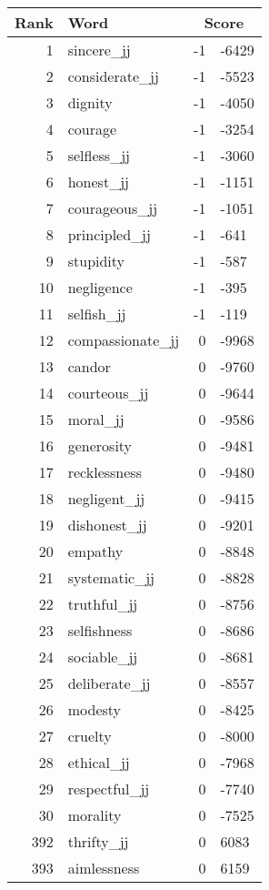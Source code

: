 \begin{longtable}[!htbp]{| rlr@{.}l |}
    \hline
    \textbf{Rank} & \textbf{Word} & \multicolumn{2}{c|}{\textbf{Score}} \\
    \hline
    \endhead
    1 & sincere\_jj & -1 & -6429 \\
    2 & considerate\_jj & -1 & -5523 \\
    3 & dignity & -1 & -4050 \\
    4 & courage & -1 & -3254 \\
    5 & selfless\_jj & -1 & -3060 \\
    6 & honest\_jj & -1 & -1151 \\
    7 & courageous\_jj & -1 & -1051 \\
    8 & principled\_jj & -1 & -641 \\
    9 & stupidity & -1 & -587 \\
    10 & negligence & -1 & -395 \\
    11 & selfish\_jj & -1 & -119 \\
    12 & compassionate\_jj & 0 & -9968 \\
    13 & candor & 0 & -9760 \\
    14 & courteous\_jj & 0 & -9644 \\
    15 & moral\_jj & 0 & -9586 \\
    16 & generosity & 0 & -9481 \\
    17 & recklessness & 0 & -9480 \\
    18 & negligent\_jj & 0 & -9415 \\
    19 & dishonest\_jj & 0 & -9201 \\
    20 & empathy & 0 & -8848 \\
    21 & systematic\_jj & 0 & -8828 \\
    22 & truthful\_jj & 0 & -8756 \\
    23 & selfishness & 0 & -8686 \\
    24 & sociable\_jj & 0 & -8681 \\
    25 & deliberate\_jj & 0 & -8557 \\
    26 & modesty & 0 & -8425 \\
    27 & cruelty & 0 & -8000 \\
    28 & ethical\_jj & 0 & -7968 \\
    29 & respectful\_jj & 0 & -7740 \\
    30 & morality & 0 & -7525 \\
    392 & thrifty\_jj & 0 & 6083 \\
    393 & aimlessness & 0 & 6159 \\

\end{longtable}
